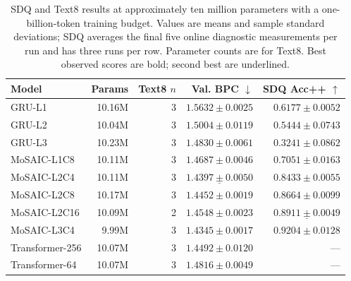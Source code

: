 \begin{table}[t]
\centering
\caption{SDQ and Text8 results at approximately ten million parameters with a one-billion-token training budget. Values are means and sample standard deviations; SDQ averages the final five online diagnostic measurements per run and has three runs per row. Parameter counts are for Text8. Best observed scores are bold; second best are underlined.}
\label{tab:historical}
\begin{tabular}{lrrrr}
\toprule
Model & Params & Text8 $n$ & Val. BPC $\downarrow$ & SDQ Acc++ $\uparrow$ \\
\midrule
GRU-L1 & 10.16M & 3 & $1.5632\pm0.0025$ & $0.6177\pm0.0052$ \\
GRU-L2 & 10.04M & 3 & $1.5004\pm0.0119$ & $0.5444\pm0.0743$ \\
GRU-L3 & 10.23M & 3 & $1.4830\pm0.0061$ & $0.3241\pm0.0862$ \\
\midrule
MoSAIC-L1C8 & 10.11M & 3 & $1.4687\pm0.0046$ & $0.7051\pm0.0163$ \\
MoSAIC-L2C4 & 10.11M & 3 & $\underline{1.4397\pm0.0050}$ & $0.8433\pm0.0055$ \\
MoSAIC-L2C8 & 10.17M & 3 & $1.4452\pm0.0019$ & $0.8664\pm0.0099$ \\
MoSAIC-L2C16 & 10.09M & 2 & $1.4548\pm0.0023$ & $\underline{0.8911\pm0.0049}$ \\
MoSAIC-L3C4 & 9.99M & 3 & $\mathbf{1.4345\pm0.0017}$ & $\mathbf{0.9204\pm0.0128}$ \\
\midrule
Transformer-256 & 10.07M & 3 & $1.4492\pm0.0120$ & --- \\
Transformer-64 & 10.07M & 3 & $1.4816\pm0.0049$ & --- \\
\bottomrule
\end{tabular}
\end{table}
